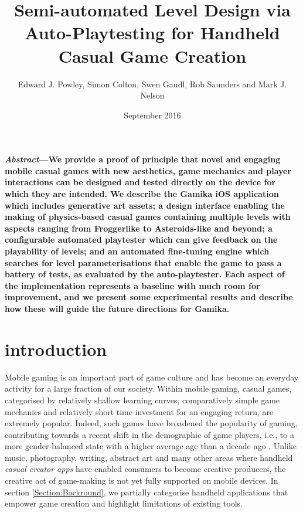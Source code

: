 \documentclass{IEEEtran}
\title{Semi-automated Level Design via Auto-Playtesting for Handheld Casual Game Creation}
\author{Edward J. Powley, Simon Colton, Swen Gaudl, Rob Saunders and Mark J. Nelson}
\date{September 2016}
\begin{document}
\maketitle

\textbf{\small{\emph{Abstract}—We provide a proof of principle that novel and engaging mobile casual games with new aesthetics, game mechanics
and player interactions can be designed and tested directly on
the device for which they are intended. We describe the Gamika
iOS application which includes generative art assets; a design
interface enabling the making of physics-based casual games
containing multiple levels with aspects ranging from Froggerlike to Asteroids-like and beyond; a configurable automated
playtester which can give feedback on the playability of levels;
and an automated fine-tuning engine which searches for level
parameterisations that enable the game to pass a battery of tests,
as evaluated by the auto-playtester. Each aspect of the implementation represents a baseline with much room for improvement,
and we present some experimental results and describe how these
will guide the future directions for Gamika.}}


\section{introduction}
\label{Section:Introduction}
Mobile gaming is an important part of game culture and has become an everyday activity for a large fraction of our society. Within mobile gaming, casual games, categorised by relatively shallow learning curves, comparatively simple game mechanics and relatively short time investment for an engaging return, are extremely popular. Indeed, such games have broadened the popularity of gaming, contributing towards a recent shift in the demographic of game players, i.e., to a more gender-balanced state with a higher average age than a decade ago \cite{juup:book}. Unlike music, photography, writing, abstract art and many other areas where handheld \emph{casual creator apps} \cite{compton2015} have enabled consumers to become creative producers, the creative act of game-making is not yet fully supported on mobile devices. In section \ref{Section:Backround}, we partially categorise handheld applications that empower game creation and highlight limitations of existing tools.
\end{document}
